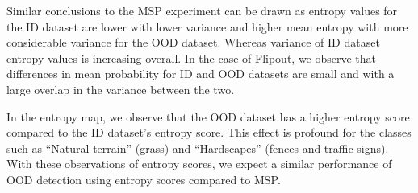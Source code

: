     Similar conclusions to the MSP experiment can be drawn as entropy values for the ID dataset are lower with lower variance and higher mean entropy with more considerable variance for the OOD dataset.
    Whereas variance of ID dataset entropy values is increasing overall.
    In the case of Flipout, we observe that differences in mean probability for ID and OOD datasets are small and with a large overlap in the variance between the two.
    
    In the entropy map, we observe that the OOD dataset has a higher entropy score compared to the ID dataset's entropy score.
    This effect is profound for the classes such as ``Natural terrain'' (grass) and ``Hardscapes'' (fences and traffic signs).
    With these observations of entropy scores, we expect a similar performance of OOD detection using entropy scores compared to MSP.

